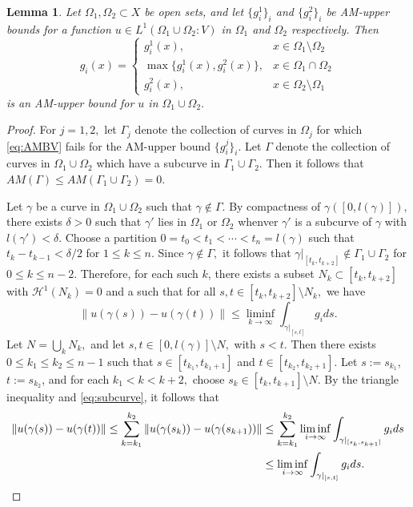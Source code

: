 \documentclass[11pt, letterpaper]{amsart} %
\numberwithin{equation}{section}
\theoremstyle{plain}
\newtheorem{lemma}[equation]{Lemma}
\theoremstyle{definition}
\begin{document}
{\begin{lemma}\cite[Lemma~2.4]{Martio}\label{lem:MartioLemma}
Let $\Omega_1,\Omega_2\subset X$ be open sets, and let $\{g^1_i\}_i$ and $\{g^2_i\}_i$ be AM-upper bounds for a function $u\in L^1(\Omega_1\cup \Omega_2: V)$ in $\Omega_1$ and $\Omega_2$ respectively.  Then 
\[
g_i(x)=
\begin{cases}
g^1_i(x),& x\in \Omega_1\setminus \Omega_2\\
\max\{g^1_i(x),g^2_i(x)\},& x\in \Omega_1\cap \Omega_2\\
g^2_i(x),&x\in \Omega_2\setminus \Omega_1
\end{cases}
\]
is an AM-upper bound for $u$ in $\Omega_1\cup\Omega_2.$ 
\end{lemma}

\begin{proof}
For $j=1,2,$ let $\Gamma_j$ denote the collection of curves in $\Omega_j$ for which \eqref{eq:AMBV} fails for the AM-upper bound $\{g^j_i\}_i$.  Let $\Gamma$ denote the collection of curves in $\Omega_1\cup\Omega_2$ which have a subcurve in $\Gamma_1\cup\Gamma_2.$  Then it follows that $AM(\Gamma)\le AM(\Gamma_1\cup\Gamma_2)=0.$

Let $\gamma$ be a curve in $\Omega_1\cup\Omega_2$ such that $\gamma\not\in\Gamma.$  By compactness of $\gamma([0,l(\gamma)]),$ there exists $\delta>0$ such that $\gamma'$ lies in $\Omega_1$ or $\Omega_2$ whenver $\gamma'$ is a subcurve of $\gamma$ with $l(\gamma')<\delta.$  Choose a partition $0=t_0<t_1<\cdots<t_n=l(\gamma)$ such that $t_k-t_{k-1}<\delta/2$ for $1\le k\le n.$  Since $\gamma\not\in\Gamma,$ it follows that $\gamma|_{[t_{k},t_{k+2}]}\not\in\Gamma_1\cup\Gamma_2$ for $0\le k\le n-2$. Therefore, for each such $k$, there exists a subset $N_k\subset[t_{k},t_{k+2}]$ with $\mathcal{H}^1(N_k)=0$ and a such that for all $s,t\in[t_{k},t_{k+2}]\setminus N_k,$ we have
\begin{equation}\label{eq:subcurve}
\|u(\gamma(s))-u(\gamma(t))\|\le\liminf_{k\to\infty}\int_{\gamma|_{[s,t]}}g_ids.
\end{equation}
Let $N=\bigcup_k N_k,$ and let $s,t\in [0,l(\gamma)]\setminus N,$ with $s<t.$  Then there exists $0\le k_1\le k_2\le n-1$ such that $s\in[t_{k_1},t_{k_1+1}]$ and $t\in[t_{k_2},t_{k_2+1}]$.  Let $s:=s_{k_1}$, $t:=s_{k_2}$, and for each $k_1< k<k+2,$ choose $s_k\in [t_k,t_{k+1}]\setminus N$.  By the triangle inequality and \eqref{eq:subcurve}, it follows that 
\begin{align*}
\|u(\gamma(s))-u(\gamma(t))\|\le\sum_{k=k_1}^{k_2}\|u(\gamma(s_{k}))-u(\gamma(s_{k+1}))\|&\le\sum_{k=k_1}^{k_2}\liminf_{i\to\infty}\int_{\gamma|_{[s_k,s_{k+1}]}}g_ids\\
	&\le\liminf_{i\to\infty}\int_{\gamma|_{[s,t]}}g_ids.\qedhere
\end{align*}
\end{proof}

}
\end{document}
